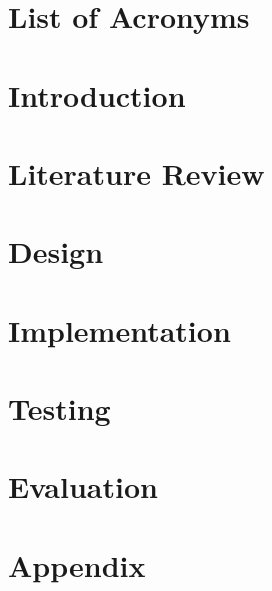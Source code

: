\documentclass[a4paper,twoside]{report}
\begin{document}
\begin{abstract}
\end{abstract}

\tableofcontents


\chapter*{List of Acronyms}
\begin{acronym}
\end{acronym}


\chapter{Introduction}


\chapter{Literature Review}


\chapter{Design}


\chapter{Implementation}


\chapter{Testing}


\chapter{Evaluation}


\appendix
\chapter{Appendix}


\renewcommand\bibname{References}
%
\end{document}
